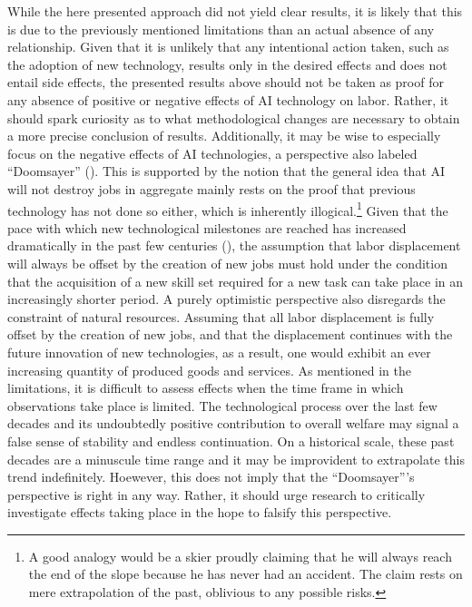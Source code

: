 \documentclass[
  11,
  a4paperpaper,
]{article}
\begin{document}
While the here presented approach did not yield clear results, it is
likely that this is due to the previously mentioned limitations than an
actual absence of any relationship. Given that it is unlikely that any
intentional action taken, such as the adoption of new technology,
results only in the desired effects and does not entail side effects,
the presented results above should not be taken as proof for any absence
of positive or negative effects of AI technology on labor. Rather, it
should spark curiosity as to what methodological changes are necessary
to obtain a more precise conclusion of results. Additionally, it may be
wise to especially focus on the negative effects of AI technologies, a
perspective also labeled ``Doomsayer''
(). This is
supported by the notion that the general idea that AI will not destroy
jobs in aggregate mainly rests on the proof that previous technology has
not done so either, which is inherently illogical.\footnote{A good
  analogy would be a skier proudly claiming that he will always reach
  the end of the slope because he has never had an accident. The claim
  rests on mere extrapolation of the past, oblivious to any possible
  risks.} Given that the pace with which new technological milestones
are reached has increased dramatically in the past few centuries
(), the assumption
that labor displacement will always be offset by the creation of new
jobs must hold under the condition that the acquisition of a new skill
set required for a new task can take place in an increasingly shorter
period. A purely optimistic perspective also disregards the constraint
of natural resources. Assuming that all labor displacement is fully
offset by the creation of new jobs, and that the displacement continues
with the future innovation of new technologies, as a result, one would
exhibit an ever increasing quantity of produced goods and services. As
mentioned in the limitations, it is difficult to assess effects when the
time frame in which observations take place is limited. The
technological process over the last few decades and its undoubtedly
positive contribution to overall welfare may signal a false sense of
stability and endless continuation. On a historical scale, these past
decades are a minuscule time range and it may be improvident to
extrapolate this trend indefinitely. Hoewever, this does not imply that
the ``Doomsayer'''s perspective is right in any way. Rather, it should
urge research to critically investigate effects taking place in the hope
to falsify this perspective.
\end{document}
